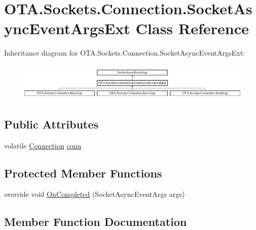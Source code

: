 \hypertarget{class_o_t_a_1_1_sockets_1_1_connection_1_1_socket_async_event_args_ext}{}\section{O\+T\+A.\+Sockets.\+Connection.\+Socket\+Async\+Event\+Args\+Ext Class Reference}
\label{class_o_t_a_1_1_sockets_1_1_connection_1_1_socket_async_event_args_ext}
Inheritance diagram for O\+T\+A.\+Sockets.\+Connection.\+Socket\+Async\+Event\+Args\+Ext\+:\begin{figure}[H]
\begin{center}
\leavevmode
\includegraphics[height=1.772152cm]{class_o_t_a_1_1_sockets_1_1_connection_1_1_socket_async_event_args_ext}
\end{center}
\end{figure}
\subsection*{Public Attributes}
\begin{DoxyCompactItemize}
\item 
volatile \hyperlink{class_o_t_a_1_1_sockets_1_1_connection}{Connection} \hyperlink{class_o_t_a_1_1_sockets_1_1_connection_1_1_socket_async_event_args_ext_ace642c66d32ba07d8182d4fc2fd11175}{conn}
\end{DoxyCompactItemize}
\subsection*{Protected Member Functions}
\begin{DoxyCompactItemize}
\item 
override void \hyperlink{class_o_t_a_1_1_sockets_1_1_connection_1_1_socket_async_event_args_ext_a27f65627f793377130cf50fde4679890}{On\+Completed} (Socket\+Async\+Event\+Args args)
\end{DoxyCompactItemize}


\subsection{Member Function Documentation}
\hypertarget{class_o_t_a_1_1_sockets_1_1_connection_1_1_socket_async_event_args_ext_a27f65627f793377130cf50fde4679890}{}
